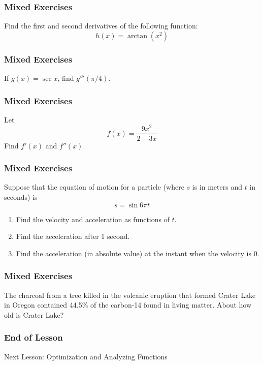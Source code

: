 \documentclass[xcolor=dvipsnames]{beamer}
\begin{document}
\begin{frame}
  \frametitle{Mixed Exercises}
  {\ubung} Find the first and second derivatives of the following function:
  \begin{equation}
    \label{eq:oophacuz}
    h(x)=\arctan(x^{2})
  \end{equation}
\end{frame}

\begin{frame}
  \frametitle{Mixed Exercises}
  {\ubung} If $g(x)=\sec{}x$, find $g'''(\pi/4)$.
\end{frame}

\begin{frame}
  \frametitle{Mixed Exercises}
  {\ubung} Let
  \begin{equation}
    \label{eq:roohahou}
    f(x)=\frac{9x^{2}}{2-3x}
  \end{equation}
Find $f'(x)$ and $f''(x)$.
\end{frame}

\begin{frame}
  \frametitle{Mixed Exercises}
  {\ubung} Suppose that the equation of motion for a particle (where $s$ is in
  meters and $t$ in seconds) is
  \begin{equation}
    \label{eq:eelajaim}
    s=\sin{}6\pi{}t
  \end{equation}
  \begin{enumerate}
  \item Find the velocity and acceleration as functions of $t$. 
  \item Find the acceleration after 1 second.
  \item Find the acceleration (in absolute value) at the instant when the velocity is 0.
  \end{enumerate}
\end{frame}

\begin{frame}
  \frametitle{Mixed Exercises}
  {\ubung} The charcoal from a tree killed in the volcanic eruption
  that formed Crater Lake in Oregon contained 44.5\% of the carbon-14
  found in living matter. About how old is Crater Lake?
\end{frame}

\begin{frame}
  \frametitle{End of Lesson}
Next Lesson: Optimization and Analyzing Functions
\end{frame}
\end{document}
